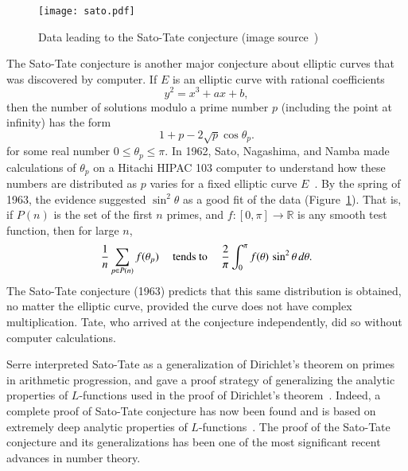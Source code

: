 \documentclass{llncs}
\newcommand{\ring}[1]{\mathbb{#1}}
\begin{document}

\begin{figure}[h!]
  \centering
\texttt{[image: sato.pdf]}
  \caption{Data leading to the Sato-Tate conjecture (image source~\cite{ST2})}
\label{fig:st}
\end{figure}



The Sato-Tate conjecture is another major conjecture about elliptic
curves that was discovered by computer.  If $E$ is an elliptic curve
with rational coefficients
\[
y^2 = x^3 + a x + b,
\]
then the number of solutions modulo a prime number $p$ (including the
point at infinity) has the form
\[
1 + p - 2\sqrt{p}\cos\theta_p.
\]
for some real number $0\le \theta_p\le \pi$.  In 1962, Sato,
Nagashima, and Namba made calculations  of $\theta_p$ on a Hitachi
HIPAC 103 computer to understand how these numbers are distributed as
$p$ varies for a fixed elliptic curve $E$~\cite{Sch}.  By the spring of 1963, the
evidence suggested  $\sin^2\theta$ as a good fit of the data (Figure~\ref{fig:st}).
That is, if $P(n)$ is the set of the first $n$ primes, and
$f:[0,\pi]\to\ring{R}$ is any smooth test function, then for large
$n$,
\[
\frac{1}{n}\sum_{p\in P(n)} f(\theta_p) \quad\hbox{ tends to }\quad
\frac{2}{\pi}\int_0^\pi f(\theta)\,\sin^2\theta\,d\theta.
\]
The Sato-Tate conjecture (1963) predicts that this same distribution is
obtained, no matter the elliptic curve, provided the curve does not
have complex multiplication.  Tate, who arrived at the conjecture
independently, did so without computer calculations.

Serre interpreted Sato-Tate as a generalization of Dirichlet's theorem
on primes in arithmetic progression, and gave a proof strategy of
generalizing the analytic properties of $L$-functions used in the
proof of Dirichlet's theorem~\cite{Se68}.  Indeed, a complete proof of
Sato-Tate conjecture has now been found and is based on extremely
deep analytic properties of $L$-functions~\cite{Car:Bourbaki}.  The
proof of the Sato-Tate conjecture and its generalizations has been one
of the most significant recent advances in number theory.
\end{document}
